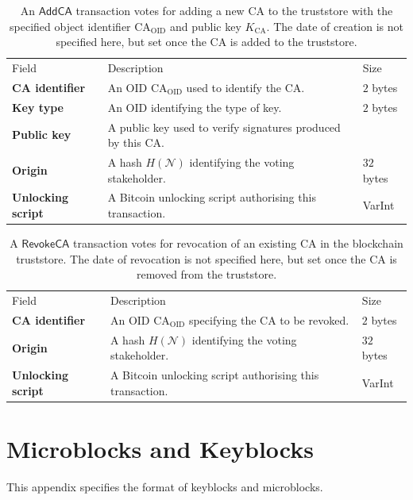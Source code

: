 \documentclass{style/kththesis}
\begin{document}
\begin{appendices}
\begin{table}[ht]
\caption{An $\mathsf{AddCA}$ transaction votes for adding a new CA to the truststore with the specified object identifier $\text{CA}_{\text{OID}}$ and public key $K_{\text{CA}}$. The date of creation is not specified here, but set once the CA is added to the truststore.}
\begin{tabularx}{\textwidth}{lXl}
\cmidrule(r){1-3}
Field & Description & Size \\ 
\cmidrule(r){1-3}
\textbf{CA identifier} & An OID $\text{CA}_{\text{OID}}$ used to identify the CA. & $2$ bytes \\
\textbf{Key type} & An OID identifying the type of key. & $2$ bytes \\
\textbf{Public key} & A public key used to verify signatures produced by this CA. & ~ \\
\textbf{Origin} & A hash $H(\mathcal{N})$ identifying the voting stakeholder. & $32$ bytes \\
\textbf{Unlocking script} & A Bitcoin unlocking script authorising this transaction. & VarInt \\
\end{tabularx}
\end{table}
\begin{table}[ht]
\caption{A $\mathsf{RevokeCA}$ transaction votes for revocation of an existing CA in the blockchain truststore. The date of revocation is not specified here, but set once the CA is removed from the truststore.}
\begin{tabularx}{\textwidth}{lXl}
\cmidrule(r){1-3}
Field & Description & Size \\ 
\cmidrule(r){1-3}
\textbf{CA identifier} & An OID $\text{CA}_{\text{OID}}$ specifying the CA to be revoked. & $2$ bytes \\
\textbf{Origin} & A hash $H(\mathcal{N})$ identifying the voting stakeholder. & $32$ bytes \\
\textbf{Unlocking script} & A Bitcoin unlocking script authorising this transaction. & VarInt \\
\end{tabularx}
\end{table}

\chapter{Microblocks and Keyblocks}
\label{app:block-format}
This appendix specifies the format of keyblocks and microblocks.


\end{appendices}
\end{document}
